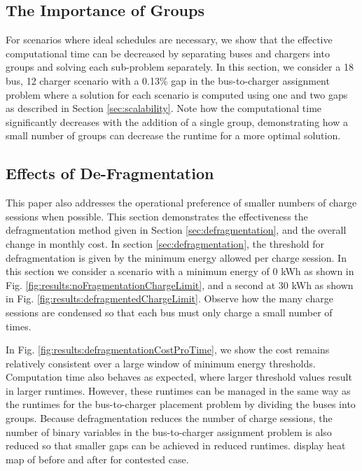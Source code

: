 \subsection{The Importance of Groups}
For scenarios where ideal schedules are necessary, we show that the effective computational time can be decreased by separating buses and chargers into groups and solving each sub-problem separately. In this section, we consider a 18 bus, 12 charger scenario with a 0.13\% gap in the bus-to-charger assignment problem where a solution for each scenario is computed using one and two gaps as described in Section \ref{sec:scalability}. Note how the computational time significantly decreases with the addition of a single group, demonstrating how a small number of groups can decrease the runtime for a more optimal solution.
 
\subsection{Effects of De-Fragmentation}
This paper also addresses the operational preference of smaller numbers of charge sessions when possible. This section demonstrates the effectiveness the defragmentation method given in Section \ref{sec:defragmentation}, and the overall change in monthly cost. In section \ref{sec:defragmentation}, the threshold for defragmentation is given by the minimum energy allowed per charge session. In this section we consider a scenario with a minimum energy of 0 kWh as shown in Fig. \ref{fig:results:noFragmentationChargeLimit}, and a second at 30 kWh as shown in Fig. \ref{fig:results:defragmentedChargeLimit}. Observe how the many charge sessions are condensed so that each bus must only charge a small number of times. 
\par In Fig. \ref{fig:results:defragmentationCostProTime}, we show the cost remains relatively consistent over a large window of minimum energy thresholds. Computation time also behaves as expected, where larger threshold values result in larger runtimes. However, these runtimes can be managed in the same way as the runtimes for the bus-to-charger placement problem by dividing the buses into groups. Because defragmentation reduces the number of charge sessions, the number of binary variables in the bus-to-charger assignment problem is also reduced so that smaller gaps can be achieved in reduced runtimes.
display heat map of before and after for contested case. 

 


